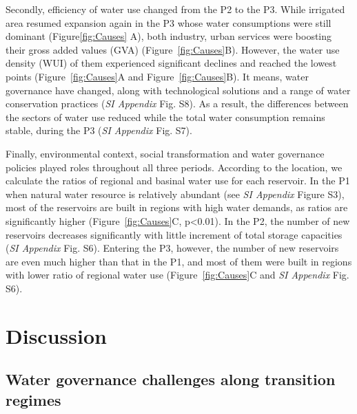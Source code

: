 \documentclass[9pt, twocolumn, twoside, lineno]{pnas-new}
\begin{document}
Secondly, efficiency of water use changed from the P2 to the P3.
While irrigated area resumed expansion again in the P3 whose water consumptions were still dominant (Figure\ref{fig:Causes} A), both industry, urban services were boosting their gross added values (GVA) (Figure~\ref{fig:Causes}B). 
However, the water use density (WUI) of them experienced significant declines and reached the lowest points (Figure~\ref{fig:Causes}A and Figure~\ref{fig:Causes}B).
It means, water governance have changed, along with technological solutions and a range of water conservation practices (\textit{SI Appendix} Fig. S8). As a result, the differences between the sectors of water use reduced while the total water consumption remains stable, during the P3 (\textit{SI Appendix} Fig. S7).

Finally, environmental context, social transformation and water governance policies played roles throughout all three periods. 
According to the location, we calculate the ratios of regional and basinal water use for each reservoir.
In the P1 when natural water resource is relatively abundant (see \textit{SI Appendix} Figure S3), most of the reservoirs are built in regions with high water demands, as ratios are significantly higher (Figure~\ref{fig:Causes}C, p<0.01). 
In the P2, the number of new reservoirs decreases significantly with little increment of total storage capacities (\textit{SI Appendix} Fig. S6).  
Entering the P3, however, the number of new reservoirs are even much higher than that in the P1, and most of them were built in regions with lower ratio of regional water use (Figure~\ref{fig:Causes}C and \textit{SI Appendix} Fig. S6).

\section*{Discussion}
\label{Discussion}

\subsection*{Water governance challenges along transition regimes}
\end{document}
